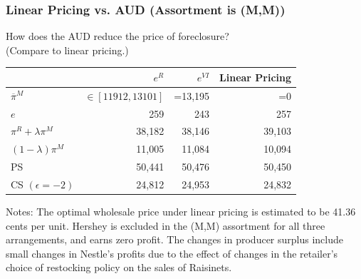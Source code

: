 \documentclass[aspectratio=169,11pt]{beamer}
\begin{document}
\begin{frame}
\frametitle{Linear Pricing vs. AUD (Assortment is (M,M))}
How does the AUD reduce the price of foreclosure? \\ (Compare to linear pricing.)
\begin{table}[h!]
  \begin{center}
   \label{tab:linearpricing}
    \begin{tabular}{|l|rrr|} 
    \hline 
          & $e^{R}$ & $e^{VI}$ & Linear Pricing   \\ \hline
    $\overline{\pi}^M$ & $\in[11912,13101]$ & =13,195 & =0      \\
    $e$ & 259   & 243   & 257    \\
    $\pi^R + \lambda \pi^M$ & 38,182 & 38,146 & 39,103   \\
    $(1-\lambda) \pi^M$ & 11,005 & 11,084 & 10,094   \\
\hline
    PS & 50,441 & 50,476 & 50,450         \\ 
    CS $(\epsilon=-2)$& 24,812 & 24,953 & 24,832         \\ \hline 
   \end{tabular}
   \end{center}
 \tiny
Notes: The optimal wholesale price under linear pricing is estimated to be 41.36 cents per unit.  Hershey is excluded in the (M,M) assortment for all three arrangements, and earns zero profit.  The changes in producer surplus include small changes in Nestle's profits due to the effect of changes in the retailer's choice of restocking policy on the sales of Raisinets. 
\end{table}

\end{frame}
\end{document}
